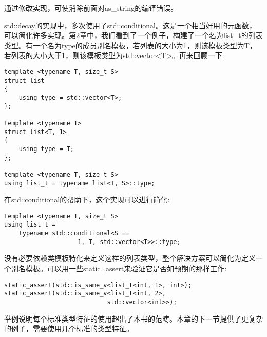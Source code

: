 通过修改实现，可使消除前面对as\_string的编译错误。

std::decay的实现中，多次使用了std::conditional。这是一个相当好用的元函数，可以简化许多实现。第2章中，我们看到了一个例子，构建了一个名为list\_t的列表类型。有一个名为type的成员别名模板，若列表的大小为1，则该模板类型为T，若列表的大小大于1，则该模板类型为std::vector<T>。再来回顾一下:

\begin{lstlisting}[style=styleCXX]
template <typename T, size_t S>
struct list
{
	using type = std::vector<T>;
};

template <typename T>
struct list<T, 1>
{
	using type = T;
};

template <typename T, size_t S>
using list_t = typename list<T, S>::type;
\end{lstlisting}

在std::conditional的帮助下，这个实现可以进行简化:

\begin{lstlisting}[style=styleCXX]
template <typename T, size_t S>
using list_t =
	typename std::conditional<S ==
					1, T, std::vector<T>>::type;
\end{lstlisting}

没有必要依赖类模板特化来定义这样的列表类型，整个解决方案可以简化为定义一个别名模板。可以用一些static\_assert来验证它是否如预期的那样工作:

\begin{lstlisting}[style=styleCXX]
static_assert(std::is_same_v<list_t<int, 1>, int>);
static_assert(std::is_same_v<list_t<int, 2>,
							std::vector<int>>);
\end{lstlisting}

举例说明每个标准类型特征的使用超出了本书的范畴。本章的下一节提供了更复杂的例子，需要使用几个标准的类型特征。



























